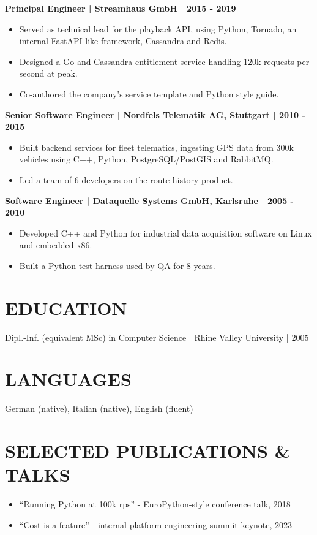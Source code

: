 \documentclass[11pt,a4paper]{article}
\begin{document}
\textbf{Principal Engineer | Streamhaus GmbH | 2015 - 2019}
\begin{itemize}
\item Served as technical lead for the playback API, using Python, Tornado, an internal FastAPI-like framework, Cassandra and Redis.
\item Designed a Go and Cassandra entitlement service handling 120k requests per second at peak.
\item Co-authored the company's service template and Python style guide.
\end{itemize}

\textbf{Senior Software Engineer | Nordfels Telematik AG, Stuttgart | 2010 - 2015}
\begin{itemize}
\item Built backend services for fleet telematics, ingesting GPS data from 300k vehicles using C++, Python, PostgreSQL/PostGIS and RabbitMQ.
\item Led a team of 6 developers on the route-history product.
\end{itemize}

\textbf{Software Engineer | Dataquelle Systems GmbH, Karlsruhe | 2005 - 2010}
\begin{itemize}
\item Developed C++ and Python for industrial data acquisition software on Linux and embedded x86.
\item Built a Python test harness used by QA for 8 years.
\end{itemize}

\section*{EDUCATION}
Dipl.-Inf. (equivalent MSc) in Computer Science | Rhine Valley University | 2005

\section*{LANGUAGES}
German (native), Italian (native), English (fluent)

\section*{SELECTED PUBLICATIONS \& TALKS}
\begin{itemize}
\item “Running Python at 100k rps” - EuroPython-style conference talk, 2018
\item “Cost is a feature” - internal platform engineering summit keynote, 2023
\end{itemize}
\end{document}

